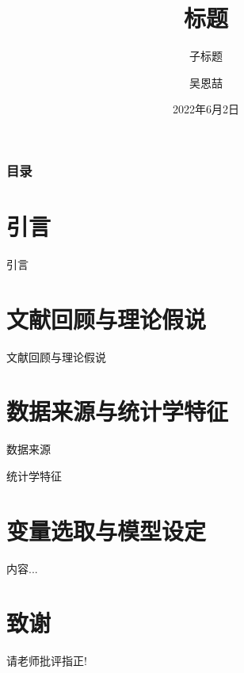 \documentclass{beamer}
\author[Enzhe Wu]{吴恩喆}
\title[Huazhong Agricultural University]{标题}
\subtitle{子标题}
\institute[enzhewu@outlook.com]{华中农业大学
	
	经济管理学院}
\date[2022.06.02]{2022年6月2日}
\begin{document}
	\kaishu
	
	\frame{\titlepage}
	
	\begin{frame}
		\frametitle{目录}
		\tableofcontents
	\end{frame}
	
	\section{引言}
	\begin{frame}{引言}
	\end{frame}

	\section{文献回顾与理论假说}
	\begin{frame}{文献回顾与理论假说}
	\end{frame}
	
	\section{数据来源与统计学特征}
	\begin{frame}{数据来源}
	\end{frame}
	\begin{frame}{统计学特征}
	\end{frame}

	\section{变量选取与模型设定}
	\begin{frame}{}
		内容...
	\end{frame}
	
	\section*{致谢}  
	\begin{frame}
		\textcolor{myNewColorA}{\Huge{\centerline{请老师批评指正!}}}
	\end{frame}
	
\end{document}
